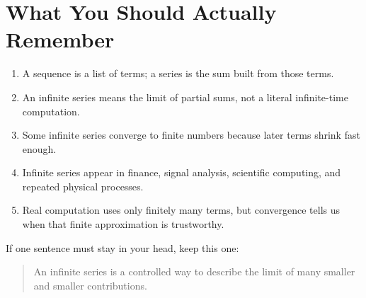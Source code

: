 \documentclass[11pt,a4paper]{article}
\theoremstyle{definition}
\theoremstyle{plain}
\begin{document}
\section{What You Should Actually Remember}

\begin{enumerate}
  \item A sequence is a list of terms; a series is the sum built from those terms.
  \item An infinite series means the limit of partial sums, not a literal infinite-time computation.
  \item Some infinite series converge to finite numbers because later terms shrink fast enough.
  \item Infinite series appear in finance, signal analysis, scientific computing, and repeated physical processes.
  \item Real computation uses only finitely many terms, but convergence tells us when that finite approximation is trustworthy.
\end{enumerate}

If one sentence must stay in your head, keep this one:
\begin{quote}
An infinite series is a controlled way to describe the limit of many smaller and smaller contributions.
\end{quote}
\end{document}
